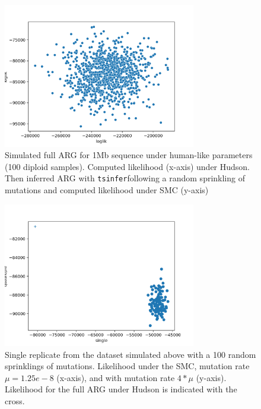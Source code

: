 \documentclass{article}
\newcommand{\tsinfer}[0]{\texttt{tsinfer}}
\begin{document}
\begin{figure}[!ht]
\centering
\includegraphics[width=0.75\textwidth]{figures/supplementary-figs/hudson_liks_vs_tsinfer_smc.png}
\caption{Simulated full ARG for 1Mb sequence under human-like parameters (100 diploid samples). Computed likelihood (x-axis) under Hudson. Then inferred ARG with \tsinfer following a random sprinkling of mutations and computed likelihood under SMC (y-axis)}
 \label{sup:fig:hudson-smc}
\end{figure}

\begin{figure}[!ht]
\centering
\includegraphics[width=0.75\textwidth]{figures/supplementary-figs/single_rep_human_like_1gb.png}
\caption{Single replicate from the dataset simulated above with a 100 random sprinklings of mutations. Likelihood under the SMC, mutation rate $\mu=1.25e-8$ (x-axis), and with mutation rate $4*\mu$ (y-axis). Likelihood for the full ARG under Hudson is indicated with the cross.}
 \label{sup:fig:single-tsinfer}
\end{figure}
\end{document}
